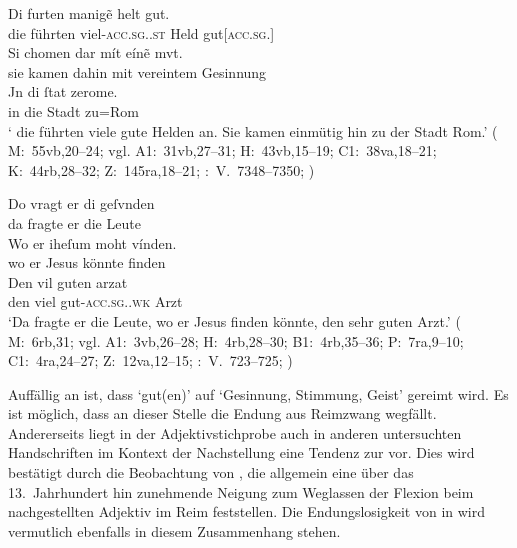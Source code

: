 \begin{exe}
\ex \label{ex:maccadj}
	\begin{xlist}
	\ex \label{ex:maccadj_1}
		\gll Di furten manigẽ helt gut. \\
			die führten viel-\textsc{acc.sg.\MascM.st} Held
			gut[\textsc{acc.sg.\MascM}] \\
	\sn \gll Si chomen dar mít eínẽ mvt. \\
			sie kamen dahin mit vereintem Gesinnung \\
	\sn \gll Jn di ſtat zerome. \\
			in die Stadt zu=Rom \\
		\trans `\textelp{} die führten viele gute Helden an. Sie kamen einmütig
			hin zu der Stadt Rom.'
			(%
				M:~55vb,20--24; vgl.
				A1:~31vb,27--31;
				H:~43vb,15--19;
				C1:~38va,18--21;
				K:~44rb,28--32;
				Z:~145ra,18--21;
				\KC:~V.~7348--7350;
				\cite[216]{schroeder1895}%
			)

	\ex \label{ex:maccadj_2}
		\gll Do vragt er di geſvnden \\
			da fragte er die Leute \\
	\sn \gll Wo er iheſum moht vínden. \\
			wo er Jesus könnte finden \\
	\sn \gll Den vil guten arzat \\
			den viel gut-\textsc{acc.sg.\MascM.wk} Arzt \\
		\trans `Da fragte er die Leute, wo er Jesus finden
			könnte, den sehr guten Arzt.'
			(%
				M:~6rb,31; vgl.
				A1:~3vb,26--28;
				H:~4rb,28--30;
				B1:~4rb,35--36;
				P:~7ra,9--10;
				C1:~4ra,24--27;
				Z:~12va,12--15;
				\KC:~V.~723--725;
				\cite[94]{schroeder1895}%
			)
		\\
	\end{xlist}
\end{exe}

Auffällig an  ist, dass  `gut(en)' auf
 `Gesinnung, Stimmung, Geist' gereimt wird. Es ist möglich, dass an
dieser Stelle die Endung aus Reimzwang wegfällt. Andererseits liegt in der
Adjektivstichprobe auch in anderen untersuchten Handschriften im
Kontext der Nachstellung eine Tendenz zur 
vor. Dies wird bestätigt durch die Beobachtung von
\citet[241]{ksw2}, die allgemein eine über das 13.~Jahrhundert hin zunehmende
Neigung zum Weglassen der Flexion beim nachgestellten
Adjektiv im Reim feststellen. Die
Endungslosigkeit von  in  wird vermutlich
ebenfalls in diesem Zusammenhang stehen.

